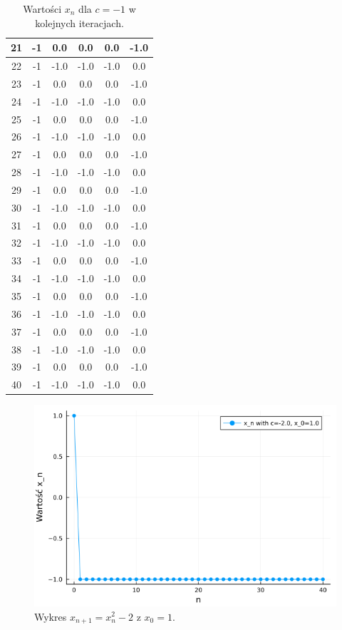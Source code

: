 \documentclass{article}
\begin{document}
\begin{table}[H]
\begin{adjustbox}{center}
\begin{tabular}{|c|c|c|c|c|c|}
    \hline
    21 & -1 & 0.0 & 0.0 & 0.0 & -1.0\\
    \hline
    22 & -1 & -1.0 & -1.0 & -1.0 & 0.0\\
    \hline
    23 & -1 & 0.0 & 0.0 & 0.0 & -1.0\\
    \hline
    24 & -1 & -1.0 & -1.0 & -1.0 & 0.0\\
    \hline
    25 & -1 & 0.0 & 0.0 & 0.0 & -1.0\\
    \hline
    26 & -1 & -1.0 & -1.0 & -1.0 & 0.0\\
    \hline
    27 & -1 & 0.0 & 0.0 & 0.0 & -1.0\\
    \hline
    28 & -1 & -1.0 & -1.0 & -1.0 & 0.0\\
    \hline
    29 & -1 & 0.0 & 0.0 & 0.0 & -1.0\\
    \hline
    30 & -1 & -1.0 & -1.0 & -1.0 & 0.0\\
    \hline
    31 & -1 & 0.0 & 0.0 & 0.0 & -1.0\\
    \hline
    32 & -1 & -1.0 & -1.0 & -1.0 & 0.0\\
    \hline
    33 & -1 & 0.0 & 0.0 & 0.0 & -1.0\\
    \hline
    34 & -1 & -1.0 & -1.0 & -1.0 & 0.0\\
    \hline
    35 & -1 & 0.0 & 0.0 & 0.0 & -1.0\\
    \hline
    36 & -1 & -1.0 & -1.0 & -1.0 & 0.0\\
    \hline
    37 & -1 & 0.0 & 0.0 & 0.0 & -1.0\\
    \hline
    38 & -1 & -1.0 & -1.0 & -1.0 & 0.0\\
    \hline
    39 & -1 & 0.0 & 0.0 & 0.0 & -1.0\\
    \hline
    40 & -1 & -1.0 & -1.0 & -1.0 & 0.0\\
    \hline
\end{tabular}
\end{adjustbox}
\caption{Wartości $x_n$ dla $c = -1$ w kolejnych iteracjach.}
\end{table}

\begin{figure}[H]
\centering
\includegraphics[width=\textwidth]{plot_1_1.png}
\caption{Wykres $x_{n + 1} = x_n^2 - 2$ z $x_0 = 1$.}
\end{figure}
\end{document}
